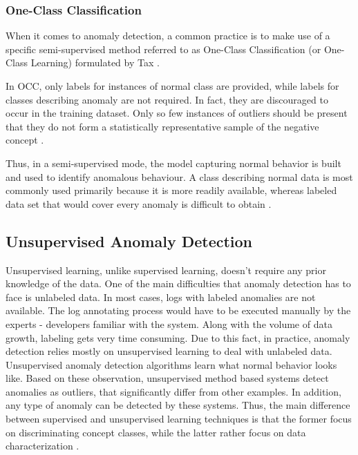  \subsubsection{One-Class Classification}
 When it comes to anomaly detection, a common practice is to make use of a specific semi-supervised method referred to as One-Class Classification (or One-Class Learning) formulated by Tax \cite{tax2002occ}. 
 
 In OCC, only labels for instances of normal class are provided, while labels for classes describing anomaly are not required. In fact, they are discouraged to occur in the training dataset. Only so few instances of outliers should be present that they do not form a statistically representative sample of the negative concept \cite{khan_madden_2014}.
 
 Thus, in a semi-supervised mode, the model capturing normal behavior is built and used to identify anomalous behaviour. A class describing normal data is most commonly used primarily because it is more readily available, whereas labeled data set that would cover every anomaly is difficult to obtain \cite{anomalyDetectionSurvey}.

 
\subsection{Unsupervised Anomaly Detection}
 Unsupervised learning, unlike supervised learning, doesn't require any prior knowledge of the data. One of the main difficulties that anomaly detection has to face is unlabeled data. In most cases, logs with labeled anomalies are not available. The log annotating process would have to be executed manually by the experts - developers familiar with the system. Along with the volume of data growth, labeling gets very time consuming. Due to this fact, in practice, anomaly detection relies mostly on unsupervised learning to deal with unlabeled data. Unsupervised anomaly detection algorithms learn what normal behavior looks like. Based on these observation, unsupervised method based systems detect anomalies as outliers, that significantly differ from other examples. In addition, any type of anomaly can be detected by these systems. Thus, the main difference between supervised and unsupervised learning techniques is that the former focus on discriminating concept classes, while the latter rather focus on data characterization \cite{Goernitz_2013}. %
 
